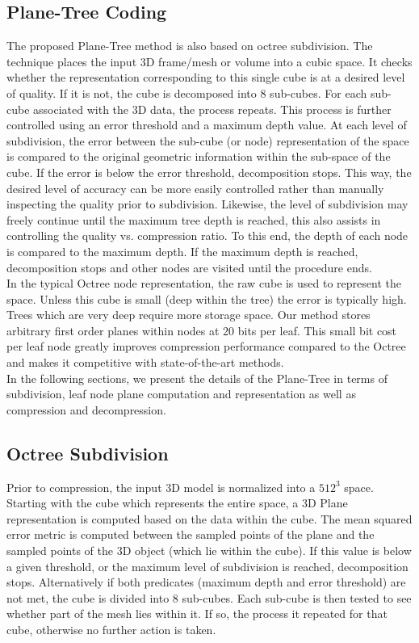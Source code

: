 \subsection{Plane-Tree Coding}

The proposed Plane-Tree method is also based on octree subdivision. The technique places the input 3D frame/mesh or volume into a cubic space. It checks whether the representation corresponding to this single cube is at a desired level of quality. If it is not, the cube is decomposed into 8 sub-cubes. For each sub-cube associated with the 3D data, the process repeats. This process is further controlled using an error threshold and a maximum depth value. At each level of subdivision, the error between the sub-cube (or node) representation of the space is compared to the original geometric information within the sub-space of the cube. If the error is below the error threshold, decomposition stops. This way, the desired level of accuracy can be more easily controlled rather than manually inspecting the quality prior to subdivision. Likewise, the level of subdivision may freely continue until the maximum tree depth is reached, this also assists in controlling the quality vs. compression ratio. To this end, the depth of each node is compared to the maximum depth. If the maximum depth is reached, decomposition stops and other nodes are visited until the procedure ends. \\

In the typical Octree node representation, the raw cube is used to represent the space. Unless this cube is small (deep within the tree) the error is typically high. Trees which are very deep require more storage space. Our method stores arbitrary first order planes within nodes at 20 bits per leaf. This small bit cost per leaf node greatly improves compression performance compared to the Octree and makes it competitive with state-of-the-art methods. \\

 
In the following sections, we present the details of the Plane-Tree in terms of subdivision, leaf node plane computation and representation as well as compression and decompression. \\


\subsection{Octree Subdivision}

Prior to compression, the input 3D model is normalized into a $512^3$ space. Starting with the cube which represents the entire space, a 3D Plane representation is computed based on the data within the cube. The mean squared error metric is computed between the sampled points of the plane and the sampled points of the 3D object (which lie within the cube). If this value is below a given threshold, or the maximum level of subdivision is reached, decomposition stops. Alternatively if both predicates (maximum depth and error threshold) are not met, the cube is divided into 8 sub-cubes. Each sub-cube is then tested to see whether part of the mesh lies within it. If so, the process it repeated for that cube, otherwise no further action is taken. \\

